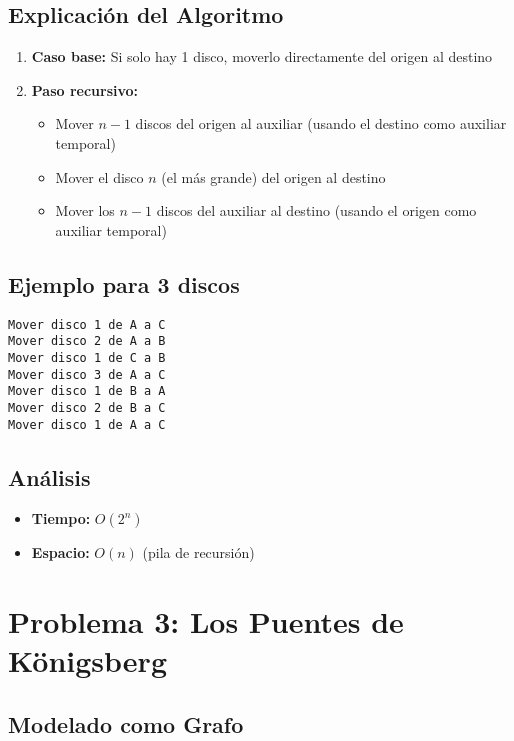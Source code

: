 \documentclass[12pt]{article}
\begin{document}
\subsection*{Explicación del Algoritmo}
\begin{enumerate}
    \item \textbf{Caso base:} Si solo hay 1 disco, moverlo directamente del origen al destino
    \item \textbf{Paso recursivo:}
    \begin{itemize}
        \item Mover $n-1$ discos del origen al auxiliar (usando el destino como auxiliar temporal)
        \item Mover el disco $n$ (el más grande) del origen al destino
        \item Mover los $n-1$ discos del auxiliar al destino (usando el origen como auxiliar temporal)
    \end{itemize}
\end{enumerate}

\subsection*{Ejemplo para 3 discos}
\begin{verbatim}
Mover disco 1 de A a C
Mover disco 2 de A a B
Mover disco 1 de C a B
Mover disco 3 de A a C
Mover disco 1 de B a A
Mover disco 2 de B a C
Mover disco 1 de A a C
\end{verbatim}

\subsection*{Análisis}
\begin{itemize}
    \item \textbf{Tiempo:} $O(2^n)$
    \item \textbf{Espacio:} $O(n)$ (pila de recursión)
\end{itemize}

\section*{Problema 3: Los Puentes de Königsberg}
\subsection*{Modelado como Grafo}
\end{document}
